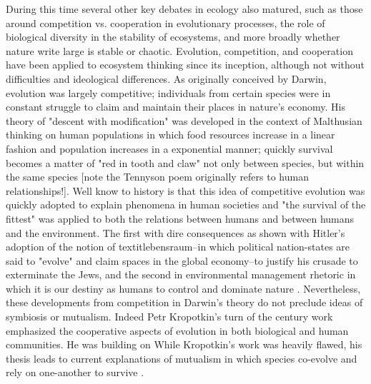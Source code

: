 During this time several other key debates in ecology also matured, such as those around competition vs. cooperation in evolutionary processes, the role of biological diversity in the stability of ecosystems, and more broadly whether nature write large is stable or chaotic. Evolution, competition, and cooperation have been applied to ecosystem thinking since its inception, although not without difficulties and ideological differences. As originally conceived by Darwin, evolution was largely competitive; individuals from certain species were in constant struggle to claim and maintain their places in nature's economy. His theory of "descent with modification" was developed in the context of Malthusian thinking on human populations in which food resources increase in a linear fashion and population increases in a exponential manner; quickly survival becomes a matter of "red in tooth and claw" not only between species, but within the same species \cite{stoddart_1966,tennyson_1849} [note the Tennyson poem originally refers to human relationships!]. Well know to history is that this idea of competitive evolution was quickly adopted to explain phenomena in human societies and "the survival of the fittest" was applied to both the relations between humans and between humans and the environment. The first with dire consequences as shown with Hitler's adoption of the notion of textit{lebensraum}--in which political nation-states are said to "evolve" and claim spaces in the global economy--to justify his crusade to exterminate the Jews, and the second in environmental management rhetoric in which it is our destiny as humans to control and dominate nature \cite{stoddart_1966,worster_1977}. Nevertheless, these developments from competition in Darwin's theory do not preclude ideas of symbiosis or mutualism. Indeed Petr Kropotkin's turn of the century work emphasized the cooperative aspects of evolution in both biological and human communities. He was building on While Kropotkin's work was heavily flawed, his thesis  leads to current explanations of mutualism in which species co-evolve and rely on one-another to survive \cite{kropotkin_1902}.


